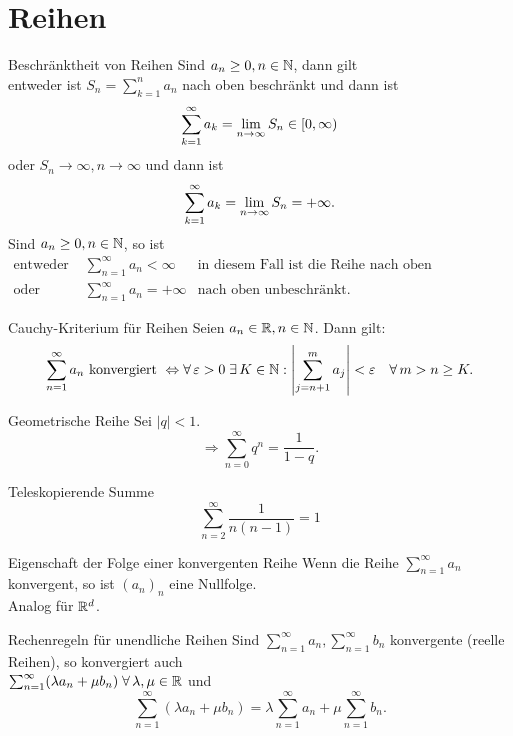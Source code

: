 \documentclass[main.tex]{subfiles}
\begin{document}
\section*{Reihen}
\begin{karte}{Beschränktheit von Reihen}
    Sind \(a_n \geq 0, n\in\mathbb{N} \), dann gilt\\
    entweder ist \(S_n = \sum_{k=1}^{n}a_n\) 
    nach oben beschränkt und dann ist 
    \[ \sum_{k=1}^{\infty}a_k = \lim\limits_{n\rightarrow\infty} 
    S_n \in [0,\infty) \]
    oder \(S_n \rightarrow \infty, 
    n\rightarrow\infty \) und dann 
    ist \[ \sum_{k=1}^{\infty}a_k 
    = \lim\limits_{n\rightarrow\infty}S_n = +\infty. \]
    Sind \(a_n \geq 0, n\in \mathbb{N} \), so ist
	\begin{align*}
        \text{entweder } 
        &\sum_{n=1}^{\infty}a_n < \infty 
        &\text{in diesem Fall ist die 
        Reihe nach oben beschränkt.}\\
        \text{oder } &\sum_{n=1}^{\infty}
        a_n = +\infty &\text{nach oben 
        unbeschränkt.}
	\end{align*}
\end{karte}
\begin{karte}{Cauchy-Kriterium für Reihen}
    Seien \(a_n \in\mathbb{R}, n\in\mathbb{N} \). Dann gilt: 
    \[ \sum_{n=1}^{\infty} a_n 
    \text{ konvergiert } \Leftrightarrow 
    \forall \varepsilon > 0 \;\exists 
    K \in \N : \abs{\sum_{j=n+1}^{m}a_j} 
    < \varepsilon \quad \forall m>n\geq K.\]
\end{karte}
\begin{karte}{Geometrische Reihe}
    Sei \(|q|<1\).
    \[ \Rightarrow \sum_{n=0}^{\infty} q^n 
    = \frac{1}{1-q}. \]
\end{karte}
\begin{karte}{Teleskopierende Summe}
    \[\sum_{n=2}^{\infty}\frac{1}{n(n-1)}=1 \]
\end{karte}
\begin{karte}{Eigenschaft der Folge einer konvergenten Reihe}
    Wenn die Reihe \(\sum_{n=1}^{\infty} 
    a_n\) konvergent, so ist \({(a_n)}_n\) 
    eine Nullfolge.\\
    Analog für \( \mathbb{R}^d \).
\end{karte}
\begin{karte}{Rechenregeln für unendliche Reihen}
    Sind \( \sum_{n=1}^{\infty}a_n, 
    \sum_{n=1}^{\infty}b_n \) konvergente 
    (reelle Reihen), so konvergiert auch \\
    \( \sum_{n=1}^{\infty}(\lambda a_n 
    + \mu b_n) \; \forall \lambda, 
    \mu \in\R \) und 
    \[ \sum_{n=1}^{\infty} 
    (\lambda a_n + \mu b_n) = \lambda 
    \sum_{n=1}^{\infty}a_n + \mu 
    \sum_{n=1}^{\infty}b_n. \]
\end{karte}
\end{document}
